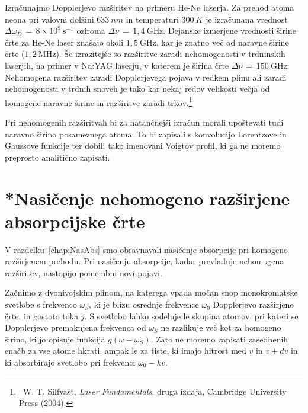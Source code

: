 Izračunajmo Dopplerjevo razširitev na primeru He-Ne laserja. Za prehod
atoma neona pri valovni dolžini $633~\si{nm}$ in temperaturi $300~\si{K}$ je izračunana vrednost
$\Delta\omega_{D}\,=\,8\times 10^{9}~\si{\second}^{-1}$ oziroma 
$\Delta\nu\,=\,1,4~\si{\giga\hertz}$. 
Dejanske izmerjene vrednosti širine črte za He-Ne laser 
znašajo okoli $1,5~\si{\giga\hertz}$, kar je znatno več od naravne širine
črte ($1,2~\si{\mega\hertz}$). Še izrazitejše so razširitve zaradi nehomogenosti
v trdninskih laserjih, na primer v Nd:YAG laserju, v katerem 
je širina črte $\Delta\nu\,=\,150~\si{\giga\hertz}$. Nehomogena razširitev zaradi Dopplerjevega pojava v 
redkem plinu ali zaradi nehomogenosti v trdnih snoveh je tako kar nekaj redov velikosti 
večja od homogene naravne širine in razširitve zaradi trkov.\footnote{~W. T. Silfvast, {\it Laser Fundamentals}, druga izdaja, Cambridge University Press (2004).}

\begin{remark}
Pri nehomogenih razširitvah bi za natančnejši izračun morali upoštevati 
tudi naravno širino posameznega atoma. To bi zapisali s konvolucijo Lorentzove
in Gaussove funkcije ter dobili tako imenovani Voigtov 
profil, ki ga ne moremo preprosto analitično zapisati.
\end{remark}

\section{*Nasičenje nehomogeno razširjene absorpcijske črte}
\label{NasabsNehom}
V razdelku~\ref{chap:NasAbs} smo obravnavali nasičenje absorpcije pri homogeno 
razširjenem prehodu. Pri nasičenju absorpcije, kadar prevladuje nehomogena razširitev,
nastopijo pomembni novi pojavi.

Začnimo z dvonivojskim plinom, na katerega 
vpada močan snop monokromatske svetlobe s frekvenco $\omega_S$,
ki je blizu osrednje frekvence $\omega_{0}$ Dopplerjevo razširjene 
črte, in gostoto toka $j$. S svetlobo
lahko sodeluje le skupina atomov, pri kateri se Dopplerjevo premaknjena
frekvenca od $\omega_S$ ne razlikuje več kot za homogeno širino, ki
jo opisuje funkcija $g(\omega-\omega_S)$. Zato ne moremo zapisati zasedbenih
enačb za vse atome hkrati, ampak le za tiste, ki imajo hitrost med
$v$ in $v+dv$ in ki absorbirajo svetlobo pri frekvenci $\omega_{0}-kv$.

